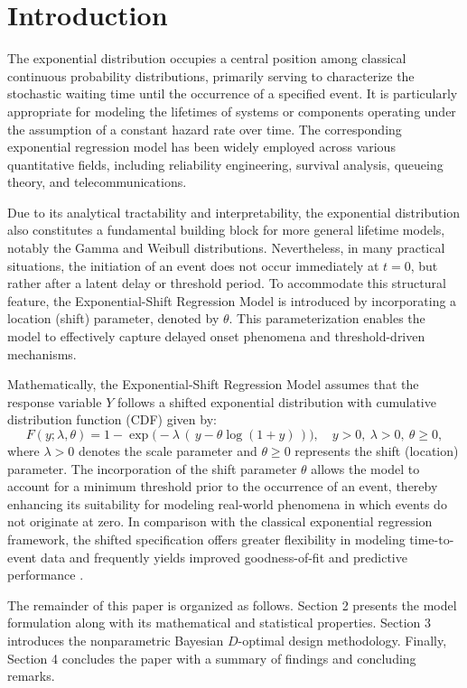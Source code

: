 \documentclass[twoside]{article}
\begin{document}
\section{Introduction}
The exponential distribution occupies a central position among classical continuous probability distributions, primarily serving to characterize the stochastic waiting time until the occurrence of a specified event. It is particularly appropriate for modeling the lifetimes of systems or components operating under the assumption of a constant hazard rate over time. The corresponding exponential regression model has been widely employed across various quantitative fields, including reliability engineering, survival analysis, queueing theory, and telecommunications.

Due to its analytical tractability and interpretability, the exponential distribution also constitutes a fundamental building block for more general lifetime models, notably the Gamma and Weibull distributions. Nevertheless, in many practical situations, the initiation of an event does not occur immediately at $t = 0$, but rather after a latent delay or threshold period. To accommodate this structural feature, the Exponential-Shift Regression Model is introduced by incorporating a location (shift) parameter, denoted by $\theta$. This parameterization enables the model to effectively capture delayed onset phenomena and threshold-driven mechanisms. 

Mathematically, the Exponential-Shift Regression Model assumes that the response variable $Y$ follows a shifted exponential distribution with cumulative distribution function (CDF) given by:
\begin{equation}
F(y; \lambda, \theta) = 1 - \exp\!\big(-\lambda\, (\, y - \theta \log(1+y)\,)\big), \quad y>0, \ \lambda>0, \ \theta \ge 0,
\end{equation}
where $\lambda > 0$ denotes the scale parameter and $\theta \ge 0$ represents the shift (location) parameter. The incorporation of the shift parameter $\theta$ allows the model to account for a minimum threshold prior to the occurrence of an event, thereby enhancing its suitability for modeling real-world phenomena in which events do not originate at zero. In comparison with the classical exponential regression framework, the shifted specification offers greater flexibility in modeling time-to-event data and frequently yields improved goodness-of-fit and predictive performance \cite{collett:2015}.

The remainder of this paper is organized as follows. Section 2 presents the model formulation along with its mathematical and statistical properties. Section 3 introduces the nonparametric Bayesian $D$-optimal design methodology. Finally, Section 4 concludes the paper with a summary of findings and concluding remarks.
\end{document}
